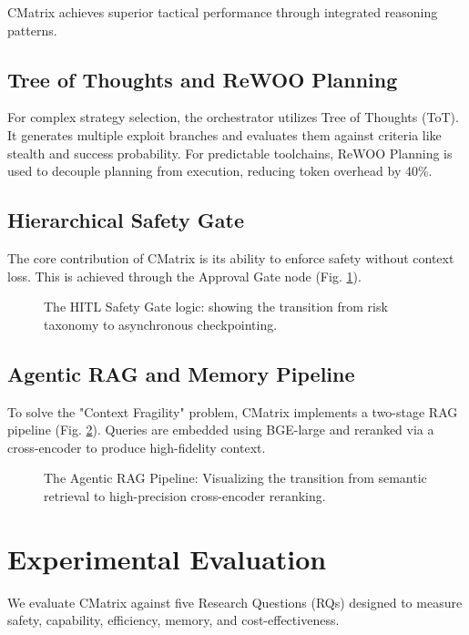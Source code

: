 \documentclass[conference]{IEEEtran}
\begin{document}
CMatrix achieves superior tactical performance through integrated reasoning patterns.

\subsection{Tree of Thoughts and ReWOO Planning}
For complex strategy selection, the orchestrator utilizes Tree of Thoughts (ToT). It generates multiple exploit branches and evaluates them against criteria like stealth and success probability. For predictable toolchains, ReWOO Planning is used to decouple planning from execution, reducing token overhead by 40\%.

\subsection{Hierarchical Safety Gate}
The core contribution of CMatrix is its ability to enforce safety without context loss. This is achieved through the Approval Gate node (Fig. \ref{fig:hitl_flow}).

\begin{figure}[h]
\centering

\caption{The HITL Safety Gate logic: showing the transition from risk taxonomy to asynchronous checkpointing.}
\label{fig:hitl_flow}
\end{figure}

\subsection{Agentic RAG and Memory Pipeline}
To solve the "Context Fragility" problem, CMatrix implements a two-stage RAG pipeline (Fig. \ref{fig:rag_pipeline}). Queries are embedded using BGE-large and reranked via a cross-encoder to produce high-fidelity context.

\begin{figure}[h]
\centering

\caption{The Agentic RAG Pipeline: Visualizing the transition from semantic retrieval to high-precision cross-encoder reranking.}
\label{fig:rag_pipeline}
\end{figure}

\section{Experimental Evaluation}
\label{sec:evaluation}

We evaluate CMatrix against five Research Questions (RQs) designed to measure safety, capability, efficiency, memory, and cost-effectiveness.
\end{document}
